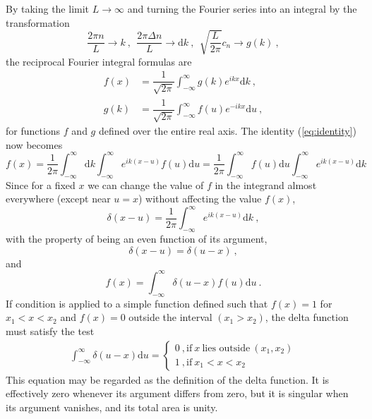 \documentclass[12pt,a4paper]{article}
\newcommand{\dif}{\mathrm{d}}
\begin{document}
By taking the limit $L \rightarrow \infty$ and turning the Fourier series into an integral by the transformation
\begin{equation}
\dfrac{2\pi n}{L} \rightarrow k ~, ~~ \dfrac{2\pi \Delta n}{L} \rightarrow \dif k ~, ~~ \sqrt{\dfrac{L}{2\pi}} c_n \rightarrow g(k) ~,
\end{equation}
the reciprocal Fourier integral formulas are
\begin{align}
f(x) &= \dfrac{1}{\sqrt{2\pi}} \int_{-\infty}^\infty g(k) e^{ikx} \dif k ~, \\
g(k) &= \dfrac{1}{\sqrt{2\pi}} \int_{-\infty}^\infty f(u) e^{-ikx} \dif u ~, 
\end{align}
for functions $f$ and $g$ defined over the entire real axis. The identity (\ref{eq:identity}) now becomes
\begin{equation}
f(x) = \dfrac{1}{2\pi} \int_{-\infty}^\infty \dif k \int_{-\infty}^\infty e^{ik(x-u)} f(u) \dif u = \dfrac{1}{2\pi} \int_{-\infty}^\infty f(u) \dif u \int_{-\infty}^\infty  e^{ik(x-u)} \dif k 
\end{equation}
Since for a fixed $x$ we can change the value of $f$ in the integrand almost everywhere (except near $u = x$) without affecting the value $f(x)$, 
\begin{equation}
\delta(x-u) = \dfrac{1}{2\pi} \int_{-\infty}^\infty e^{ik(x-u)} \dif k ~,
\end{equation}
with the property of being an even function of its argument,
\begin{equation}
\delta(x-u) = \delta(u-x) ~,
\end{equation}
and
\begin{equation}
f(x) = \int_{-\infty}^\infty \delta(u-x) f(u) \dif u ~.
\end{equation}
If condition is applied to a simple function defined such that $f(x) = 1$ for $x_1 < x < x_2$ and $f(x) = 0$ outside the interval $(x_1 > x_2)$, the delta function must satisfy the test
\begin{align}
\int_{-\infty}^\infty \delta(u-x) \dif u = 
\begin{cases}
0 ~, \text{if} ~x ~\text{lies outside} ~(x_1, x_2) \\
1 ~, \text{if} ~x_1 < x < x_2 
\end{cases}
\end{align}
This equation may be regarded as the definition of the delta function. It is effectively zero whenever its argument differs from zero, but it is singular when its argument vanishes, and its total area is unity.
\end{document}
